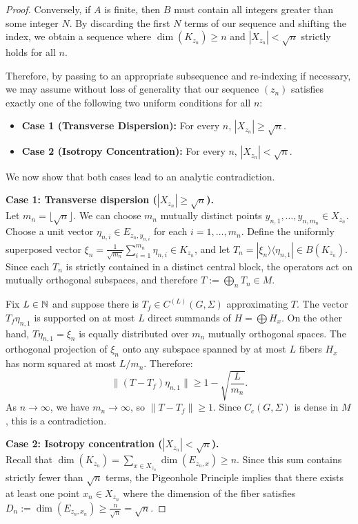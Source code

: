 \begin{proof}
Conversely, if $A$ is finite, then $B$ must contain all integers greater than some integer $N$. By discarding the first $N$ terms of our sequence and shifting the index, we obtain a sequence where $\dim(K_{z_n}) \ge n$ and $|X_{z_n}| < \sqrt{n}$ strictly holds for all $n$.

Therefore, by passing to an appropriate subsequence and re-indexing if necessary, we may assume without loss of generality that our sequence $(z_n)$ satisfies exactly one of the following two uniform conditions for all $n$:

\begin{itemize}
    \item \textbf{Case 1 (Transverse Dispersion):} For every $n$, $|X_{z_n}| \ge \sqrt{n}$.
    \item \textbf{Case 2 (Isotropy Concentration):} For every $n$, $|X_{z_n}| < \sqrt{n}$.
\end{itemize}

We now show that both cases lead to an analytic contradiction.

\medskip
\noindent
\textbf{Case 1: Transverse dispersion ($|X_{z_n}| \ge \sqrt{n}$).} \\
Let $m_n = \lfloor \sqrt{n} \rfloor$. We can choose $m_n$ mutually distinct points $y_{n,1}, \dots, y_{n, m_n} \in X_{z_n}$. Choose a unit vector $\eta_{n,i} \in E_{z_n, y_{n,i}}$ for each $i = 1, \dots, m_n$.
Define the uniformly superposed vector $\xi_n = \frac{1}{\sqrt{m_n}} \sum_{i=1}^{m_n} \eta_{n,i} \in K_{z_n}$, and let $T_n = |\xi_n\rangle\langle\eta_{n,1}| \in B(K_{z_n})$. Since each $T_n$ is strictly contained in a distinct central block, the operators act on mutually orthogonal subspaces, and therefore $T := \bigoplus_n T_n \in M$.

Fix $L \in \mathbb N$ and suppose there is $T_f \in C^{(L)}(G,\Sigma)$ approximating $T$. The vector $T_f \eta_{n,1}$ is supported on at most $L$ direct summands of $H = \bigoplus H_x$. On the other hand, $T \eta_{n,1} = \xi_n$ is equally distributed over $m_n$ mutually orthogonal spaces. 
The orthogonal projection of $\xi_n$ onto any subspace spanned by at most $L$ fibers $H_x$ has norm squared at most $L/m_n$. Therefore:
\[
\|(T - T_f)\eta_{n,1}\| \ge 1 - \sqrt{\frac{L}{m_n}}.
\]
As $n \to \infty$, we have $m_n \to \infty$, so $\|T - T_f\| \ge 1$. Since $C_c(G,\Sigma)$ is dense in $M$, this is a contradiction.

\medskip
\noindent
\textbf{Case 2: Isotropy concentration ($|X_{z_n}| < \sqrt{n}$).} \\
Recall that $\dim(K_{z_n}) = \sum_{x \in X_{z_n}} \dim(E_{z_n, x}) \ge n$. Since this sum contains strictly fewer than $\sqrt{n}$ terms, the Pigeonhole Principle implies that there exists at least one point $x_n \in X_{z_n}$ where the dimension of the fiber satisfies $D_n := \dim(E_{z_n, x_n}) \ge \frac{n}{\sqrt{n}} = \sqrt{n}$.
    

\end{proof}
